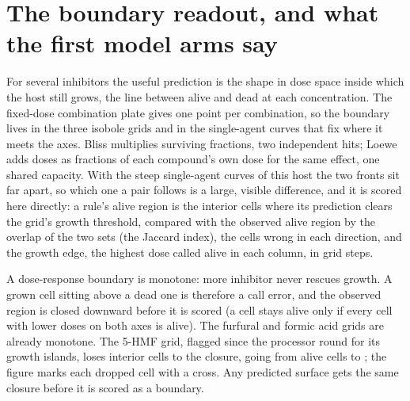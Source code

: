 
\clearpage
\section{The boundary readout, and what the first model arms say}
\label{sec:boundary}

For several inhibitors the useful prediction is the shape in dose space inside which the
host still grows, the line between alive and dead at each concentration. The
fixed-dose combination plate gives one point per combination, so the boundary lives in
the three isobole grids and in the single-agent curves that fix where it meets the axes.
Bliss multiplies surviving fractions, two independent hits; Loewe adds doses as
fractions of each compound's own dose for the same effect, one shared capacity. With the
steep single-agent curves of this host the two fronts sit far apart, so which one a pair
follows is a large, visible difference, and it is scored here directly: a rule's alive
region is the interior cells where its prediction clears the grid's growth threshold,
compared with the observed alive region by the overlap of the two sets (the Jaccard
index), the cells wrong in each direction, and the growth edge, the highest dose called
alive in each column, in grid steps.

 A dose-response boundary is monotone: more
inhibitor never rescues growth. A grown cell sitting above a dead one is therefore a call
error, and the observed region is closed downward before it is scored (a cell stays alive
only if every cell with lower doses on both axes is alive). The furfural and formic acid
grids are already monotone. The 5-HMF grid, flagged since the processor round for its
growth islands, loses \hydbndexTwoEightislands{} interior cells to the closure, going
from \hydbndexTwoEightaliveRaw{} alive cells to \hydbndexTwoEightaliveMonotone{}; the
figure marks each dropped cell with a cross. Any predicted surface gets the same closure
before it is scored as a boundary.

